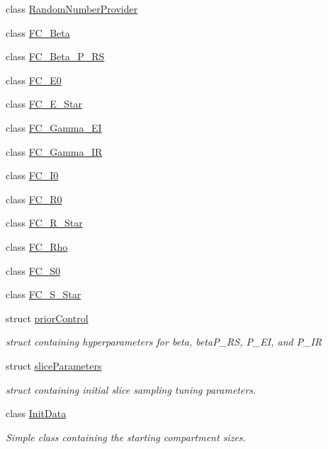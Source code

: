 \begin{DoxyCompactItemize}
\item 
class \hyperlink{classSpatialSEIR_1_1RandomNumberProvider}{Random\-Number\-Provider}
\item 
class \hyperlink{classSpatialSEIR_1_1FC__Beta}{F\-C\-\_\-\-Beta}
\item 
class \hyperlink{classSpatialSEIR_1_1FC__Beta__P__RS}{F\-C\-\_\-\-Beta\-\_\-\-P\-\_\-\-R\-S}
\item 
class \hyperlink{classSpatialSEIR_1_1FC__E0}{F\-C\-\_\-\-E0}
\item 
class \hyperlink{classSpatialSEIR_1_1FC__E__Star}{F\-C\-\_\-\-E\-\_\-\-Star}
\item 
class \hyperlink{classSpatialSEIR_1_1FC__Gamma__EI}{F\-C\-\_\-\-Gamma\-\_\-\-E\-I}
\item 
class \hyperlink{classSpatialSEIR_1_1FC__Gamma__IR}{F\-C\-\_\-\-Gamma\-\_\-\-I\-R}
\item 
class \hyperlink{classSpatialSEIR_1_1FC__I0}{F\-C\-\_\-\-I0}
\item 
class \hyperlink{classSpatialSEIR_1_1FC__R0}{F\-C\-\_\-\-R0}
\item 
class \hyperlink{classSpatialSEIR_1_1FC__R__Star}{F\-C\-\_\-\-R\-\_\-\-Star}
\item 
class \hyperlink{classSpatialSEIR_1_1FC__Rho}{F\-C\-\_\-\-Rho}
\item 
class \hyperlink{classSpatialSEIR_1_1FC__S0}{F\-C\-\_\-\-S0}
\item 
class \hyperlink{classSpatialSEIR_1_1FC__S__Star}{F\-C\-\_\-\-S\-\_\-\-Star}
\item 
struct \hyperlink{structSpatialSEIR_1_1priorControl}{prior\-Control}
\begin{DoxyCompactList}\small\item\em struct containing hyperparameters for beta, beta\-P\-\_\-\-R\-S, P\-\_\-\-E\-I, and P\-\_\-\-I\-R \end{DoxyCompactList}\item 
struct \hyperlink{structSpatialSEIR_1_1sliceParameters}{slice\-Parameters}
\begin{DoxyCompactList}\small\item\em struct containing initial slice sampling tuning parameters. \end{DoxyCompactList}\item 
class \hyperlink{classSpatialSEIR_1_1InitData}{Init\-Data}
\begin{DoxyCompactList}\small\item\em Simple class containing the starting compartment sizes. \end{DoxyCompactList}\item 

\end{DoxyCompactItemize}
